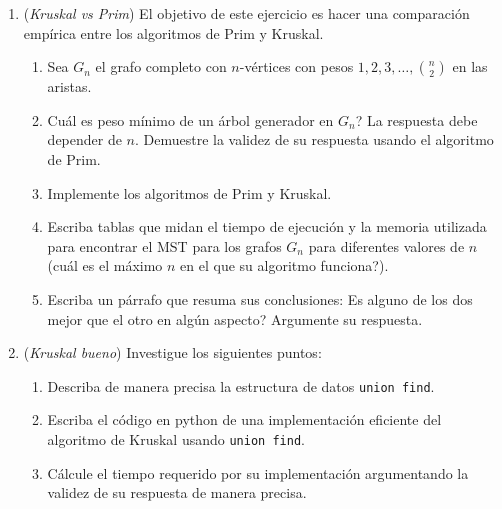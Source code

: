 \documentclass[12pt, a4paper]{article}
\begin{document}
\begin{enumerate}
\item ({\it Kruskal vs Prim}) El objetivo de este ejercicio es hacer una comparación empírica entre los algoritmos de Prim y Kruskal. 
\begin{enumerate}
\item Sea $G_n$ el grafo completo con $n$-vértices con pesos $1,2,3,\dots, \binom{n}{2}$ en las aristas.
\item Cuál es peso mínimo de un árbol generador en $G_n$? La respuesta debe depender de $n$. Demuestre la validez de su respuesta usando el algoritmo de Prim.
\item Implemente los algoritmos de Prim y Kruskal.
\item Escriba tablas que midan el tiempo de ejecución y la memoria utilizada para encontrar el MST para los grafos $G_n$ para diferentes valores de $n$ (cuál es el máximo $n$ en el que su algoritmo funciona?).
\item Escriba un párrafo que resuma sus conclusiones: Es alguno de los dos mejor que el otro en algún aspecto? Argumente su respuesta.
\end{enumerate}

\item ({\it Kruskal bueno}) Investigue los siguientes puntos:
\begin{enumerate}
\item Describa de manera precisa la estructura de datos \verb!union find!.
\item Escriba el código en python de una implementación eficiente del algoritmo de Kruskal usando \verb!union find!.
\item Cálcule el tiempo requerido por su implementación argumentando la validez de su respuesta de manera precisa.
\end{enumerate}


\end{enumerate}
\end{document}
